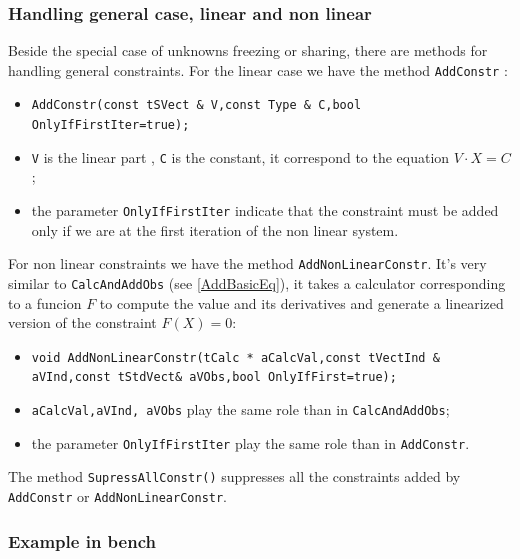 
\subsubsection{Handling general case, linear and non linear}

Beside the special case of unknowns freezing or sharing, there are methods for handling general constraints.
For the linear case we have the method {\tt AddConstr} :

\begin{itemize}
    \item {\tt AddConstr(const tSVect \& V,const Type \& C,bool OnlyIfFirstIter=true);}
    \item  {\tt V} is the linear part , {\tt C} is the constant, it correspond to the equation $ V \cdot X = C$ ;
    \item  the parameter {\tt  OnlyIfFirstIter} indicate that the constraint must be added only if we are at the
           first iteration of the non linear system.
\end{itemize}

For non linear constraints we have the method {\tt AddNonLinearConstr}.  It's very similar to {\tt CalcAndAddObs}
(see \ref{AddBasicEq}), it takes a calculator corresponding to a funcion $F$ to compute the value 
and its derivatives and generate a linearized version of the constraint $F(X)=0$:

\begin{itemize}
    \item {\tt  void AddNonLinearConstr(tCalc * aCalcVal,const tVectInd \& aVInd,const tStdVect\& aVObs,bool  OnlyIfFirst=true);}

    \item  {\tt aCalcVal,aVInd, aVObs} play the same role than  in {\tt CalcAndAddObs};

    \item  the parameter {\tt  OnlyIfFirstIter} play the same role than in {\tt AddConstr}. 
\end{itemize}

The method {\tt SupressAllConstr()} suppresses all the constraints
added by {\tt AddConstr}  or {\tt AddNonLinearConstr}.


\subsubsection{Example in bench}

